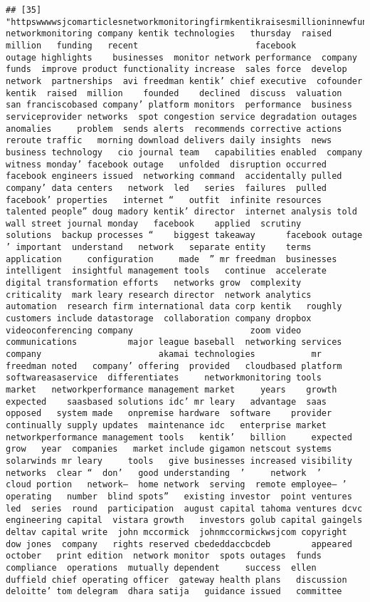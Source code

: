 \documentclass[
]{article}
\begin{document}
\begin{verbatim}
## [35] "httpswwwwsjcomarticlesnetworkmonitoringfirmkentikraisesmillioninnewfunding networkmonitoring company kentik technologies   thursday  raised  million   funding   recent                       facebook          outage highlights    businesses  monitor network performance  company    funds  improve product functionality increase  sales force  develop  network  partnerships  avi freedman kentik’ chief executive  cofounder kentik  raised  million    founded    declined  discuss  valuation  san franciscobased company’ platform monitors  performance  business  serviceprovider networks  spot congestion service degradation outages  anomalies     problem  sends alerts  recommends corrective actions       reroute traffic   morning download delivers daily insights  news  business technology   cio journal team   capabilities enabled  company  witness monday’ facebook outage   unfolded  disruption occurred  facebook engineers issued  networking command  accidentally pulled  company’ data centers   network  led   series  failures  pulled   facebook’ properties   internet “   outfit  infinite resources      talented people” doug madory kentik’ director  internet analysis told  wall street journal monday   facebook    applied  scrutiny    solutions  backup processes “    biggest takeaway      facebook outage   ’ important  understand   network   separate entity    terms    application     configuration     made  ” mr freedman  businesses     intelligent  insightful management tools   continue  accelerate  digital transformation efforts   networks grow  complexity  criticality  mark leary research director  network analytics  automation  research firm international data corp kentik   roughly  customers include datastorage  collaboration company dropbox  videoconferencing company                       zoom video communications          major league baseball  networking services company                       akamai technologies           mr freedman noted   company’ offering  provided   cloudbased platform  softwareasaservice  differentiates     networkmonitoring tools   market   networkperformance management market     years    growth  expected    saasbased solutions idc’ mr leary   advantage  saas  opposed   system made   onpremise hardware  software    provider  continually supply updates  maintenance idc   enterprise market  networkperformance management tools   kentik’   billion     expected  grow   year  companies   market include gigamon netscout systems  solarwinds mr leary     tools   give businesses increased visibility   networks  clear “  don’   good understanding  ’     network  ’    cloud portion   network—  home network  serving  remote employee— ’ operating   number  blind spots”   existing investor  point ventures led  series  round  participation  august capital tahoma ventures dcvc engineering capital  vistara growth   investors golub capital gaingels  deltav capital write  john mccormick  johnmccormickwsjcom copyright  dow jones  company   rights reserved cbededdaccbcdeb        appeared   october   print edition  network monitor  spots outages  funds      compliance  operations  mutually dependent     success  ellen duffield chief operating officer  gateway health plans   discussion  deloitte’ tom delegram  dhara satija   guidance issued   committee  
\end{verbatim}
\end{document}
